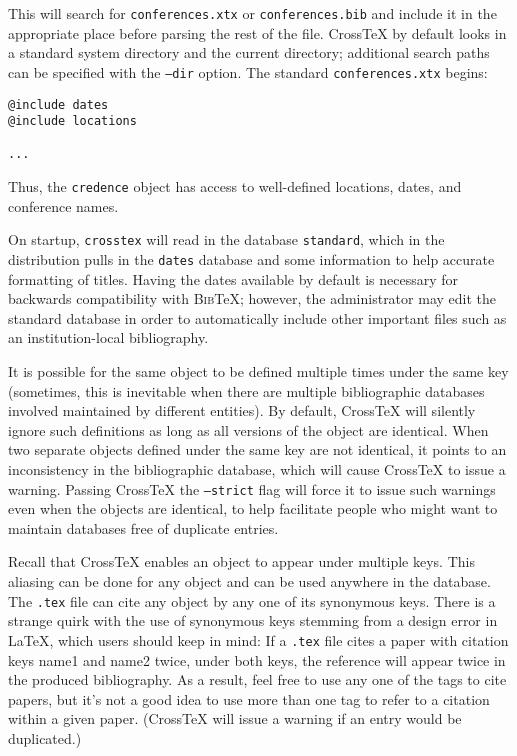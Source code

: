 \documentclass{article}
\newcommand{\XTeX}{Cross\TeX}
\newcommand{\BibTeX}{\textsc{Bib}\TeX}
\begin{document}
This will search for \texttt{conferences.xtx} or \texttt{conferences.bib} and include it in the appropriate place before parsing the rest of the file. \XTeX{} by default looks in a standard system directory and the current directory; additional search paths can be specified with the \texttt{--dir} option. The standard \texttt{conferences.xtx} begins:

\begin{small}\begin{verbatim}
@include dates
@include locations

...
\end{verbatim}\end{small}

Thus, the \texttt{credence} object has access to well-defined locations, dates, and conference names.

On startup, \texttt{crosstex} will read in the database \texttt{standard}, which in the distribution pulls in the \texttt{dates} database and some information to help accurate formatting of titles.  Having the dates available by default is necessary for backwards compatibility with \BibTeX{}; however, the administrator may edit the standard database in order to automatically include other important files such as an institution-local bibliography.

It is possible for the same object to be defined multiple times under the 
same key (sometimes, this is inevitable when there are multiple bibliographic
databases involved maintained by different entities). By default, \XTeX{}
will silently ignore such definitions as long as all versions of the object
are identical. When two separate objects defined under the same key are not
identical, it points to an inconsistency in the bibliographic database, which
will cause \XTeX{} to issue a warning. Passing \XTeX{} the \texttt{--strict} flag will force it to issue such warnings even when the objects are identical,
to help facilitate people who might want to maintain databases free of
duplicate entries.

Recall that \XTeX{} enables an object to appear under multiple keys. 
This aliasing can be done for any object and can be used anywhere in
the database. The \texttt{.tex} file can cite any object by any one of
its synonymous keys. There is a strange quirk with the use of
synonymous keys stemming from a design error in \LaTeX{}, which users
should keep in mind: If a \texttt{.tex} file cites a paper with
citation keys name1 and name2 twice, under both keys, the reference
will appear twice in the produced bibliography. As a result, feel free
to use any one of the tags to cite papers, but it's not a good idea to
use more than one tag to refer to a citation within a given paper.
(\XTeX{} will issue a warning if an entry would be duplicated.)
\end{document}
